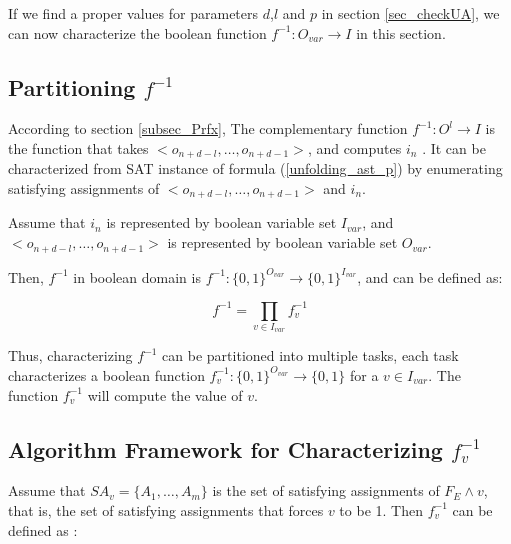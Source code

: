 \documentclass[journal]{IEEEtran}
\begin{document}
If we find a proper values for parameters $d$,$l$ and $p$ in section \ref{sec_checkUA},
we can now characterize the boolean function $f^{-1}:O_{var}\to I$ in this section.

\subsection{Partitioning $f^{-1}$}

According to section \ref{subsec_Prfx},
The complementary function $f^{-1}:O^l\to I$ is the function that takes $<o_{n+d-l},\dots , o_{n+d-1} >$,
and computes $i_n$ .
It can be characterized from SAT instance of formula (\ref{unfolding_ast_p})
by enumerating satisfying assignments of $<o_{n+d-l},\dots , o_{n+d-1} >$ and $i_n$.

Assume that $i_n$ is represented by boolean variable set $I_{var}$,
and $<o_{n+d-l},\dots , o_{n+d-1} >$ is represented by boolean variable set $O_{var}$.

Then,
$f^{-1}$ in boolean domain is $f^{-1}:\{0,1\}^{O_{var}}\to \{0,1\}^{I_{var}}$,
and can be defined as:

\begin{equation}
f^{-1}= \prod _{v\in I_{var}} f_v^{-1}
\end{equation}

Thus,
characterizing $f^{-1}$ can be partitioned into multiple tasks,
each task characterizes a boolean function $f^{-1}_v: \{0,1\}^{O_{var}}\to \{0,1\}$ for a $v\in I_{var}$.
The function $f^{-1}_v$ will compute the value of $v$.

\subsection{Algorithm Framework for Characterizing $f^{-1}_v$}
%
Assume that $SA_v=\{A_1,\dots,A_m\}$ is the set of satisfying assignments of $F_E\wedge v$,
that is,
the set of satisfying assignments that forces $v$ to be 1.
Then $f^{-1}_v$ can be defined as :
\end{document}
